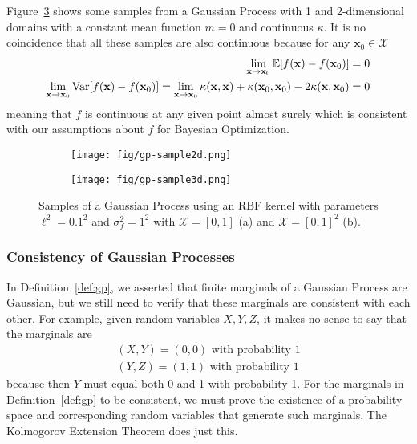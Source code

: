 Figure~\ref{fig:gp-sample} shows some samples from a Gaussian Process with 1 and 2-dimensional domains with a constant mean function $m = 0$ and continuous $\kappa$.
It is no coincidence that all these samples are also continuous because for any $\mathbf{x}_0 \in \mathcal{X}$
\begin{align*}
    \lim_{\mathbf{x} \to \mathbf{x}_0 }\mathbb{E}[f(\mathbf{x}) - f(\mathbf{x}_0)] = 0 \\
    \lim_{\mathbf{x} \to \mathbf{x}_0 }\operatorname{Var}[f(\mathbf{x}) - f(\mathbf{x}_0)] =
    \lim_{\mathbf{x} \to \mathbf{x}_0} \kappa(\mathbf{x}, \mathbf{x}) + \kappa(\mathbf{x}_0, \mathbf{x}_0) - 2\kappa(\mathbf{x}, \mathbf{x}_0)
    = 0
\end{align*}
meaning that $f$ is continuous at any given point almost surely which is consistent with our assumptions about $f$ for Bayesian Optimization.

\begin{figure}
    \centering
    \begin{subfigure}[b]{0.45\textwidth}
        \centering
        \texttt{[image: fig/gp-sample2d.png]}
        \caption{}
        \label{subfig:2d-gp-sample}
    \end{subfigure}
    \hfill
    \begin{subfigure}[b]{0.45\textwidth}
        \centering
        \texttt{[image: fig/gp-sample3d.png]}
        \caption{}
        \label{subfig:3d-gp-sample}
    \end{subfigure}
    \hfill
    \caption{Samples of a Gaussian Process using an RBF kernel with parameters $\ell^{2} = 0.1^2$ and $\sigma^{2}_f = 1 ^ 2$ with
    $\mathcal{X} = [0, 1]$ (a) and $\mathcal{X} = [0, 1]^2$ (b).
    }
    \label{fig:gp-sample}
\end{figure}

\subsubsection{Consistency of Gaussian Processes}

In Definition~\ref{def:gp}, we asserted that finite marginals of a Gaussian Process are Gaussian, but we still need to verify that these marginals are consistent with each other.
For example, given random variables $X, Y, Z$, it makes no sense to say that the marginals are
\begin{align*}
    (X, Y) = (0, 0) \text{ with probability 1} \\
    (Y, Z) = (1, 1) \text{ with probability 1}
\end{align*}
because then $Y$ must equal both 0 and 1 with probability 1.
For the marginals in Definition~\ref{def:gp} to be consistent, we must prove the existence of a probability space and corresponding random variables that generate such marginals.
The Kolmogorov Extension Theorem does just this.

